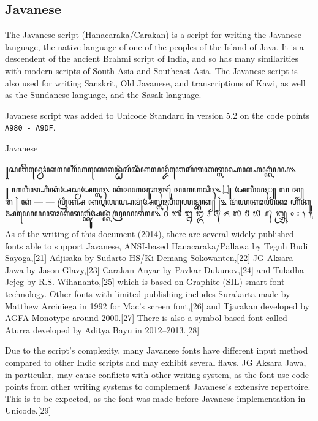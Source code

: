 \subsection{Javanese}

The Javanese script (Hanacaraka/Carakan) is a script for writing the Javanese language, the native language of one of the peoples of the Island of Java. It is a descendent of the ancient Brahmi script of India, and so has many similarities with modern scripts of South Asia and Southeast Asia. The Javanese script is also used for writing Sanskrit, Old Javanese, and transcriptions of Kawi, as well as the Sundanese language, and the Sasak language.

Javanese script was added to Unicode Standard in version 5.2 on the code points \texttt{A980 - A9DF}.


\newfontfamily{}

\newfontfamily{}

\begin{scriptexample}[]{Javanese}
\bgroup
\javanese

꧋ꦱꦧꦼꦤ꧀ꦮꦺꦴꦁꦏꦭꦲꦶꦂꦲꦏꦺꦏꦤ꧀ꦛꦶꦩꦂꦢꦶꦏꦭꦤ꧀ꦢꦂꦧꦺꦩꦂꦠꦧꦠ꧀ꦭꦤ꧀ꦲꦏ꧀ꦲꦏ꧀ꦏꦁꦥꦝ꧉

꧋ ꦲꦮꦶꦠ꧀ꦲꦶꦏꦁꦄꦱ꧀ꦩꦄꦭ꧀ꦭꦃ꧈ ꦏꦁꦩꦲꦩꦸꦫꦃꦠꦸꦂ ꦩꦲꦲꦱꦶꦃ꧉ 	 
 ۝꧋ ꦄꦭꦶꦥꦃ꧀ ꦭ ꦩ꧀ ꦫ ꧌ ꦏꦁ — — ꦥꦿꦶꦏ꧀ꦱ ꦏꦉꦪꦥ꧀ꦥꦩꦸꦁꦄꦭ꧀ꦭꦃꦥꦶꦪꦺꦩ꧀ꦧꦏ꧀ ꧌꧉ ꦩꦁꦪꦏꦴꦪꦤꦴ ꦲꦶꦏꦸꦄꦪꦺꦪꦠꦴꦏꦶꦠꦧ꧀ꦑꦸꦂꦄꦤ꧀ꦏꦁꦥꦿꦪꦠꦭ꧉ 	 
᭐	᭑	᭒	᭓	᭔	᭕	᭖	᭗	᭘	᭙	᭚	᭛	᭜	᭝	᭞	᭟

 
\egroup
\end{scriptexample}

As of the writing of this document (2014), there are several widely published fonts able to support Javanese, ANSI-based Hanacaraka/Pallawa by Teguh Budi Sayoga,[21] Adjisaka by Sudarto HS/Ki Demang Sokowanten,[22] JG Aksara Jawa by Jason Glavy,[23] Carakan Anyar by Pavkar Dukunov,[24] and Tuladha Jejeg by R.S. Wihananto,[25] which is based on Graphite (SIL) smart font technology. Other fonts with limited publishing includes Surakarta made by Matthew Arciniega in 1992 for Mac's screen font,[26] and Tjarakan developed by AGFA Monotype around 2000.[27] There is also a symbol-based font called Aturra developed by Aditya Bayu in 2012–2013.[28]

Due to the script's complexity, many Javanese fonts have different input method compared to other Indic scripts and may exhibit several flaws. JG Aksara Jawa, in particular, may cause conflicts with other writing system, as the font use code points from other writing systems to complement Javanese's extensive repertoire. This is to be expected, as the font was made before Javanese implementation in Unicode.[29]

